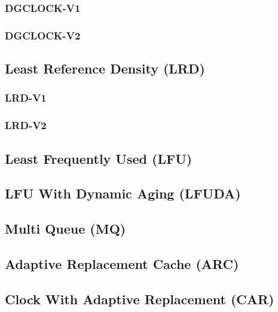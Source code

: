 \subsubsection[DGCLOCK-V1]{DGCLOCK-V1} \label{subsubsec:dgclock-v1}

\subsubsection[DGCLOCK-V2]{DGCLOCK-V2} \label{subsubsec:dgclock-v2}

\subsection[LRD]{Least Reference Density (LRD)} \label{subsec:lrd}

\subsubsection[LRD-V1]{LRD-V1} \label{subsubsec:lrd-v1}

\subsubsection[LRD-V2]{LRD-V2} \label{subsubsec:lrd-v2}

\subsection[LFU]{Least Frequently Used (LFU)} \label{subsec:lfu}

\subsection[LFUDA]{LFU With Dynamic Aging (LFUDA)} \label{subsec:lfuda}

\subsection[MQ]{Multi Queue (MQ)} \label{subsec:mq}

\subsection[ARC]{Adaptive Replacement Cache (ARC)} \label{subsec:arc}

\subsection[CAR]{Clock With Adaptive Replacement (CAR)} \label{subsec:car}

